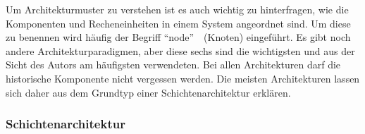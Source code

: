 \documentclass[../vs-script-first-v01.tex]{subfiles}
\begin{document}
Um Architekturmuster zu verstehen ist es auch wichtig zu hinterfragen, wie die Komponenten und Recheneinheiten in einem System angeordnet sind. Um diese zu benennen wird häufig der Begriff \enquote{node}~\cite{tanenbaum2017distributed}~(Knoten) eingeführt.
Es gibt noch andere Architekturparadigmen, aber diese sechs sind die wichtigsten und aus der Sicht des Autors am häufigsten verwendeten. Bei allen Architekturen darf die historische Komponente nicht vergessen werden. Die meisten Architekturen lassen sich daher aus dem Grundtyp einer Schichtenarchitektur erklären. 

\subsubsection{Schichtenarchitektur}
\end{document}
